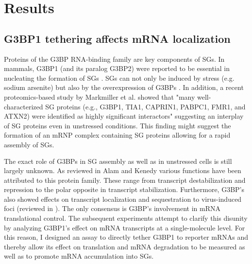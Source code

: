 \chapter{Results}


\section{G3BP1 tethering affects mRNA localization}

Proteins of the G3BP RNA-binding family are key components of SGs.
In mammals, G3BP1 (and its paralog G3BP2) were reported to be essential in nucleating the formation of SGs \cite{kedersha_g3bp-caprin1-usp10_2016}.
SGs can not only be induced by stress (e.g. sodium arsenite) but also by the overexpression of G3BPs \cite{tourriere_rasgap-associated_2003}.
In addition, a recent proteomics-based study by Markmiller et al. \cite{markmiller_context-dependent_2018} showed that "many well-characterized SG proteins (e.g., G3BP1, TIA1, CAPRIN1, PABPC1, FMR1, and ATXN2) were identified as highly significant interactors" suggesting an interplay of SG proteins even in unstressed conditions.
This finding might suggest the formation of an mRNP complex containing SG proteins allowing for a rapid assembly of SGs.

The exact role of G3BPs in SG assembly as well as in unstressed cells is still largely unknown.
As reviewed in Alam and Kenedy \cite{alam_rasputin_2019} various functions have been attributed to this protein family.
These range from transcript destabilization and repression to the polar opposite in transcript stabilization.
Furthermore, G3BP's also showed effects on transcript localization and sequestration to virus-induced foci (reviewed in \cite{zhang_chronic_2019}).
The only consensus is G3BP's involvement in mRNA translational control.
The subsequent experiments attempt to clarify this disunity by analyzing G3BP1's effect on mRNA transcripts at a single-molecule level.
For this reason, I designed an assay to directly tether G3BP1 to reporter mRNAs and thereby allow its effect on translation and mRNA degradation to be measured as well as to promote mRNA accumulation into SGs.

